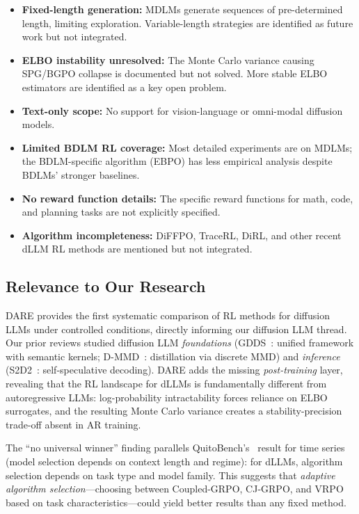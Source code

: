 \documentclass[11pt]{article}
\begin{document}
\begin{itemize}
    \item \textbf{Fixed-length generation:} MDLMs generate sequences of pre-determined length, limiting exploration. Variable-length strategies are identified as future work but not integrated.
    \item \textbf{ELBO instability unresolved:} The Monte Carlo variance causing SPG/BGPO collapse is documented but not solved. More stable ELBO estimators are identified as a key open problem.
    \item \textbf{Text-only scope:} No support for vision-language or omni-modal diffusion models.
    \item \textbf{Limited BDLM RL coverage:} Most detailed experiments are on MDLMs; the BDLM-specific algorithm (EBPO) has less empirical analysis despite BDLMs' stronger baselines.
    \item \textbf{No reward function details:} The specific reward functions for math, code, and planning tasks are not explicitly specified.
    \item \textbf{Algorithm incompleteness:} DiFFPO, TraceRL, DiRL, and other recent dLLM RL methods are mentioned but not integrated.
\end{itemize}

\subsection{Relevance to Our Research}

DARE provides the first systematic comparison of RL methods for diffusion LLMs under controlled conditions, directly informing our diffusion LLM thread. Our prior reviews studied diffusion LLM \textit{foundations} (GDDS~\cite{gdds}: unified framework with semantic kernels; D-MMD~\cite{dmmd}: distillation via discrete MMD) and \textit{inference} (S2D2~\cite{s2d2}: self-speculative decoding). DARE adds the missing \textit{post-training} layer, revealing that the RL landscape for dLLMs is fundamentally different from autoregressive LLMs: log-probability intractability forces reliance on ELBO surrogates, and the resulting Monte Carlo variance creates a stability-precision trade-off absent in AR training.

The ``no universal winner'' finding parallels QuitoBench's~\cite{quitobench} result for time series (model selection depends on context length and regime): for dLLMs, algorithm selection depends on task type and model family. This suggests that \textit{adaptive algorithm selection}---choosing between Coupled-GRPO, CJ-GRPO, and VRPO based on task characteristics---could yield better results than any fixed method.
\end{document}
